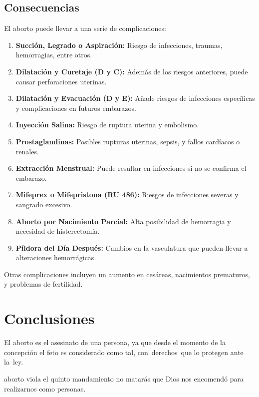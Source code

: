 \documentclass[
  jou,
  floatsintext,
  longtable,
  a4paper,
  nolmodern,
  notxfonts,
  notimes,
  colorlinks=true,linkcolor=blue,citecolor=blue,urlcolor=blue]{apa7}
\providecommand{\tightlist}{%
  \setlength{\itemsep}{0pt}\setlength{\parskip}{0pt}}
\begin{document}
\subsection{Consecuencias}\label{consecuencias}

El aborto puede llevar a una serie de complicaciones:

\begin{enumerate}
\def\labelenumi{\arabic{enumi}.}
\tightlist
\item
  \textbf{Succión, Legrado o Aspiración:} Riesgo de infecciones,
  traumas, hemorragias, entre otros.
\item
  \textbf{Dilatación y Curetaje (D y C):} Además de los riesgos
  anteriores, puede causar perforaciones uterinas.
\item
  \textbf{Dilatación y Evacuación (D y E):} Añade riesgos de infecciones
  específicas y complicaciones en futuros embarazos.
\item
  \textbf{Inyección Salina:} Riesgo de ruptura uterina y embolismo.
\item
  \textbf{Prostaglandinas:} Posibles rupturas uterinas, sepsis, y fallos
  cardíacos o renales.
\item
  \textbf{Extracción Menstrual:} Puede resultar en infecciones si no se
  confirma el embarazo.
\item
  \textbf{Mifeprex o Mifepristona (RU 486):} Riesgos de infecciones
  severas y sangrado excesivo.
\item
  \textbf{Aborto por Nacimiento Parcial:} Alta posibilidad de hemorragia
  y necesidad de histerectomía.
\item
  \textbf{Píldora del Día Después:} Cambios en la vasculatura que pueden
  llevar a alteraciones hemorrágicas.
\end{enumerate}

Otras complicaciones incluyen un aumento en cesáreas, nacimientos
prematuros, y problemas de fertilidad.

\section{Conclusiones}\label{conclusiones}

El aborto es el asesinato de una persona, ya que desde el momento de la
concepción el feto es considerado como tal, con~derechos~que lo protegen
ante la~ley.

aborto viola el quinto mandamiento no matarás que Dios nos encomendó
para realizarnos como personas.
\end{document}
